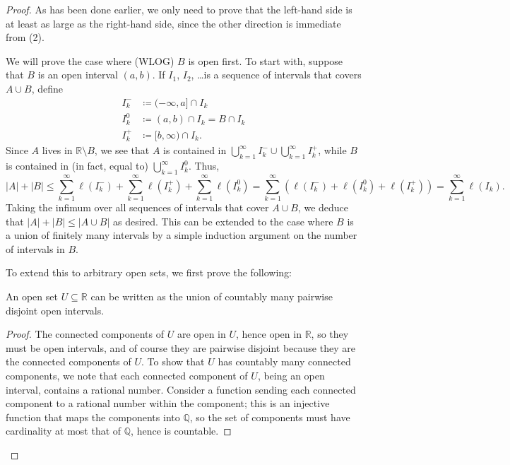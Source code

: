 \documentclass[11pt]{scrartcl}
\providecommand{\QQ}{\mathbb Q}
\providecommand{\RR}{\mathbb R}
\providecommand{\abs}[1]{\left\lvert #1\right\rvert}
\begin{document}
\begin{proof}
    As has been done earlier, we only need to prove that
    the left-hand side is at least as large as the right-hand side,
    since the other direction is immediate from (2).

    We will prove the case where (WLOG) $B$ is open first.
    To start with, suppose that $B$ is an open interval $(a,b)$.
    If $I_1$, $I_2$, \dots is a sequence of intervals
    that covers $A\cup B$, define
    \begin{align*}
	I_k^- &\coloneq (-\infty, a]\cap I_k\\
	I_k^0 &\coloneq (a,b)\cap I_k = B\cap I_k\\
	I_k^+ &\coloneq [b, \infty)\cap I_k.
    \end{align*}
    Since $A$ lives in $\RR\setminus B$, we see that
    $A$ is contained in $\bigcup_{k=1}^\infty I_k^-\cup\bigcup_{k=1}^\infty I_k^+$,
    while $B$ is contained in (in fact, equal to) $\bigcup_{k=1}^\infty I_k^0$.
    Thus,
    \begin{equation*}
	\abs A + \abs B \le \sum_{k=1}^\infty \ell(I_k^-) +
	\sum_{k=1}^\infty \ell(I_k^+) + \sum_{k=1}^\infty\ell (I_k^0)
	= \sum_{k=1}^\infty (\ell(I_k^-) + \ell(I_k^0) + \ell(I_k^+))
	= \sum_{k=1}^\infty \ell(I_k).
    \end{equation*}
    Taking the infimum over all sequences of intervals that cover $A\cup B$,
    we deduce that $\abs A + \abs B \le \abs{A\cup B}$ as desired.
    This can be extended to the case where $B$ is a union of finitely many intervals
    by a simple induction argument on the number of intervals in $B$.

    To extend this to arbitrary open sets, we first prove the following:
    \begin{claim}
        \label{claim:open-set-into-intervals}
        An open set $U\subseteq\RR$ can be written as
	the union of countably many pairwise disjoint open intervals.
    \end{claim}
    \begin{proof}
        The connected components of $U$ are open in $U$,
	hence open in $\RR$, so they must be open intervals,
	and of course they are pairwise disjoint
	because they are the connected components of $U$.
	To show that $U$ has countably many connected components,
	we note that each connected component of $U$,
	being an open interval, contains a rational number.
	Consider a function sending each connected component
	to a rational number within the component;
	this is an injective function that maps the components into $\QQ$,
	so the set of components must have cardinality
	at most that of $\QQ$, hence is countable.
    \end{proof}


\end{proof}
\end{document}
